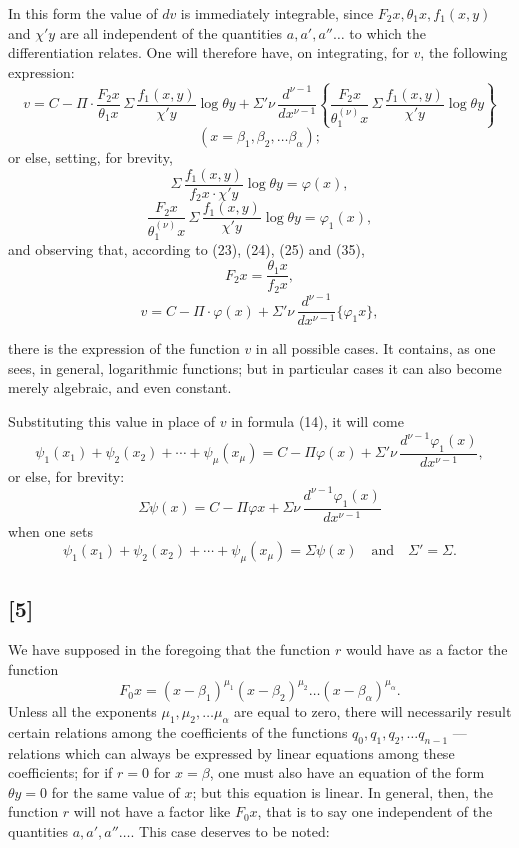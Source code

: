 \documentclass{article}
\begin{document}
In this form the value of $dv$ is immediately integrable, since $F_2 x, \theta_1 x, f_1(x, y)$ and $\chi' y$ are all independent of the quantities $a, a', a'' \ldots$ to which the differentiation relates. One will therefore have, on integrating, for $v$, the following expression:
\[ v = C - \Pi \cdot \frac{F_2 x}{\theta_1 x}\,\Sigma\,\frac{f_1(x, y)}{\chi' y}\log\theta y + \Sigma' \nu\,\frac{d^{\nu-1}}{dx^{\nu-1}} \left\{ \frac{F_2 x}{\theta_1^{(\nu)} x}\,\Sigma\,\frac{f_1(x, y)}{\chi' y}\log\theta y \right\} \tag{37} \]
\[ (x = \beta_1, \beta_2, \ldots \beta_\alpha); \]
or else, setting, for brevity,
\[ \Sigma\,\frac{f_1(x, y)}{f_2 x \cdot \chi' y}\log\theta y = \varphi(x), \tag{38} \]
\[ \frac{F_2 x}{\theta_1^{(\nu)} x}\,\Sigma\,\frac{f_1(x, y)}{\chi' y}\log\theta y = \varphi_1(x), \]
and observing that, according to (23), (24), (25) and (35),
\[ F_2 x = \frac{\theta_1 x}{f_2 x}, \]
\[ v = C - \Pi \cdot \varphi(x) + \Sigma' \nu\,\frac{d^{\nu-1}}{dx^{\nu-1}} \{\varphi_1 x\}, \tag{39} \]

there is the expression of the function $v$ in all possible cases. It contains, as one sees, in general, logarithmic functions; but in particular cases it can also become merely algebraic, and even constant.

Substituting this value in place of $v$ in formula (14), it will come
\[ \psi_1(x_1) + \psi_2(x_2) + \cdots + \psi_\mu(x_\mu) = C - \Pi\varphi(x) + \Sigma' \nu\,\frac{d^{\nu-1}\varphi_1(x)}{dx^{\nu-1}}, \tag{40} \]
or else, for brevity:
\[ \Sigma\psi(x) = C - \Pi\varphi x + \Sigma\nu\,\frac{d^{\nu-1}\varphi_1(x)}{dx^{\nu-1}} \tag{41} \]
when one sets
\[ \psi_1(x_1) + \psi_2(x_2) + \cdots + \psi_\mu(x_\mu) = \Sigma\psi(x) \quad \text{and} \quad \Sigma' = \Sigma. \tag{42} \]

\subsection*{[5]}

We have supposed in the foregoing that the function $r$ would have as a factor the function
\[ F_0 x = (x-\beta_1)^{\mu_1}(x-\beta_2)^{\mu_2} \ldots (x-\beta_\alpha)^{\mu_\alpha}. \]
Unless all the exponents $\mu_1, \mu_2, \ldots \mu_\alpha$ are equal to zero, there will necessarily result certain relations among the coefficients of the functions $q_0, q_1, q_2, \ldots q_{n-1}$ — relations which can always be expressed by linear equations among these coefficients; for
if $r = 0$ for $x = \beta$, one must also have an equation of the form $\theta y = 0$ for the same value of $x$; but this equation is linear. In general, then, the function $r$ will not have a factor like $F_0 x$, that is to say one independent of the quantities $a, a', a'' \ldots$. This case deserves to be noted:
\end{document}
